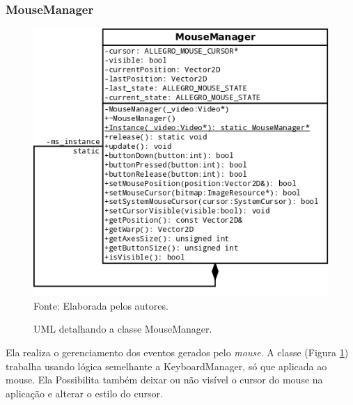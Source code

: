 \subsubsection{MouseManager}
%
%
\begin{figure}[H]
    \centering
    \caption{UML detalhando a classe MouseManager.}
    \label{MouseManager}
    \includegraphics[scale = 0.50]{uml/MouseManager.png}
    \\Fonte: Elaborada pelos autores.
\end{figure}
%
%
Ela realiza o gerenciamento dos eventos gerados pelo \textit{mouse}. A classe (Figura \ref{MouseManager}) trabalha usando lógica semelhante a KeyboardManager, só que aplicada ao mouse. Ela Possibilita também deixar ou não visível o cursor do mouse na aplicação e alterar o estilo do cursor.
%
%
